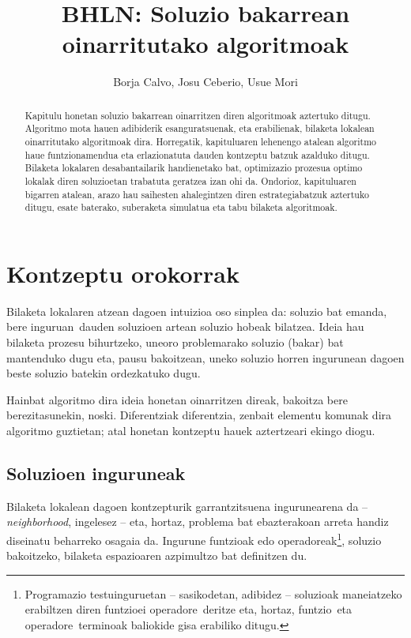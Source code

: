 \documentclass[eu]{ifirak}\usepackage[]{graphicx}\usepackage[]{color}
\newcommand{\zkk}{\guillemotleft}
\newcommand{\skk}{\guillemotright}
\begin{document}
\title{BHLN: Soluzio bakarrean oinarritutako algoritmoak}
\date{}
\author{Borja Calvo, Josu Ceberio, Usue Mori}







\maketitle

\begin{abstract}
Kapitulu honetan soluzio bakarrean oinarritzen diren algoritmoak aztertuko ditugu. Algoritmo mota hauen adibiderik esanguratsuenak, eta erabilienak, bilaketa lokalean oinarritutako algoritmoak dira. Horregatik, kapituluaren lehenengo atalean algoritmo haue funtzionamendua eta erlazionatuta dauden kontzeptu batzuk azalduko ditugu. Bilaketa lokalaren desabantailarik handienetako bat, optimizazio prozesua optimo lokalak diren soluzioetan trabatuta geratzea izan ohi da. Ondorioz, kapituluaren bigarren atalean, arazo hau saihesten ahalegintzen diren estrategiabatzuk aztertuko ditugu, esate baterako, suberaketa simulatua eta tabu bilaketa algoritmoak.
\end{abstract}

\section{Kontzeptu orokorrak}
Bilaketa lokalaren atzean dagoen intuizioa oso sinplea da: soluzio bat emanda, bere \zkk inguruan\skk\ dauden soluzioen artean soluzio hobeak bilatzea. Ideia hau bilaketa prozesu bihurtzeko, uneoro problemarako soluzio (bakar) bat mantenduko dugu eta, pausu bakoitzean, uneko soluzio horren ingurunean dagoen beste soluzio batekin ordezkatuko dugu. 

Hainbat algoritmo dira ideia honetan oinarritzen direak, bakoitza bere berezitasunekin, noski. Diferentziak diferentzia, zenbait elementu komunak dira algoritmo guztietan; atal honetan kontzeptu hauek aztertzeari ekingo diogu.

\subsection{Soluzioen inguruneak}

Bilaketa lokalean dagoen kontzepturik garrantzitsuena ingurunearena da -- \textit{neighborhood}, ingelesez -- eta, hortaz, problema bat ebazterakoan arreta handiz diseinatu beharreko osagaia da. Ingurune funtzioak edo operadoreak\footnote{Programazio testuinguruetan -- sasikodetan, adibidez -- soluzioak maneiatzeko erabiltzen diren funtzioei \zkk operadore\skk\ deritze eta, hortaz, \zkk funtzio\skk\ eta \zkk operadore\skk\ terminoak baliokide gisa erabiliko ditugu.}, soluzio bakoitzeko, bilaketa espazioaren azpimultzo bat definitzen du.
\end{document}
